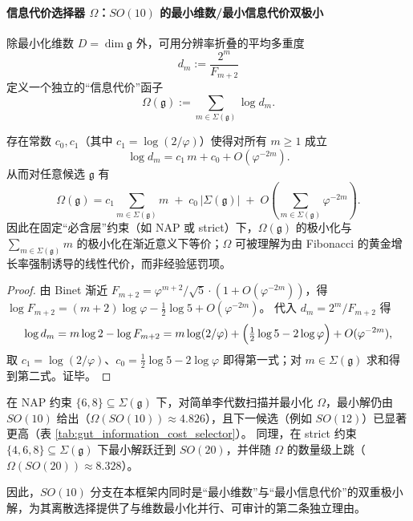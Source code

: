 \paragraph{信息代价选择器 \texorpdfstring{$\Omega$}{Omega}：\texorpdfstring{$SO(10)$}{SO(10)} 的最小维数/最小信息代价双极小}
除最小化维数 \(D=\dim\mathfrak g\) 外，可用分辨率折叠的平均多重度
\[
d_m:=\frac{2^m}{F_{m+2}}
\]
定义一个独立的“信息代价”函子
\[
\Omega(\mathfrak g):=\sum_{m\in\Sigma(\mathfrak g)}\log d_m.
\]
\begin{proposition}\label{prop:gut-omega-linear-action}
存在常数 \(c_0,c_1\)（其中 \(c_1=\log(2/\varphi)\)）使得对所有 \(m\ge 1\) 成立
\[
\log d_m
=
c_1\,m+c_0+O(\varphi^{-2m}).
\]
从而对任意候选 \(\mathfrak g\) 有
\[
\Omega(\mathfrak g)
=
c_1\sum_{m\in\Sigma(\mathfrak g)} m
\;+\;
c_0\,|\Sigma(\mathfrak g)|
\;+\;
O\!\left(\sum_{m\in\Sigma(\mathfrak g)}\varphi^{-2m}\right).
\]
因此在固定“必含层”约束（如 NAP 或 strict）下，\(\Omega(\mathfrak g)\) 的极小化与
\(\sum_{m\in\Sigma(\mathfrak g)} m\) 的极小化在渐近意义下等价；\(\Omega\) 可被理解为由 Fibonacci 的黄金增长率强制诱导的线性代价，而非经验惩罚项。
\end{proposition}
\begin{proof}
由 Binet 渐近 \(F_{m+2}=\varphi^{m+2}/\sqrt5\cdot(1+O(\varphi^{-2m}))\)，得
\(
\log F_{m+2}=(m+2)\log\varphi-\tfrac12\log 5+O(\varphi^{-2m})
\)。
代入 \(d_m=2^m/F_{m+2}\) 得
\[
\log d_m
=m\log 2-\log F_{m+2}
=m\log(2/\varphi)+\Bigl(\tfrac12\log 5-2\log\varphi\Bigr)+O(\varphi^{-2m}),
\]
取 \(c_1=\log(2/\varphi)\)、\(c_0=\tfrac12\log 5-2\log\varphi\) 即得第一式；对 \(m\in\Sigma(\mathfrak g)\) 求和得到第二式。证毕。
\end{proof}
在 NAP 约束 \(\{6,8\}\subseteq\Sigma(\mathfrak g)\) 下，对简单李代数扫描并最小化 \(\Omega\)，最小解仍由 \(SO(10)\) 给出（\(\Omega(SO(10))\approx 4.826\)），且下一候选（例如 \(SO(12)\)）已显著更高（表 \ref{tab:gut_information_cost_selector}）。
同理，在 strict 约束 \(\{4,6,8\}\subseteq\Sigma(\mathfrak g)\) 下最小解跃迁到 \(SO(20)\)，并伴随 \(\Omega\) 的数量级上跳（\(\Omega(SO(20))\approx 8.328\)）。

因此，\(SO(10)\) 分支在本框架内同时是“最小维数”与“最小信息代价”的双重极小解，为其离散选择提供了与维数最小化并行、可审计的第二条独立理由。

